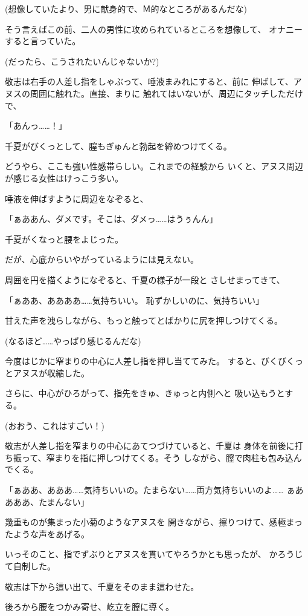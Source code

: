 ﻿\documentclass[
    book,tate,
    line_length=30zw,
    jafontsize=12pt,
    paper=b5j,
    landscape,
    ]{jlreq}
\begin{document}
(想像していたより、男に献身的で、Ｍ的なところがあるんだな)

そう言えばこの前、二人の男性に攻められているところを想像して、
オナニーすると言っていた。

(だったら、こうされたいんじゃないか?)

敬志は右手の人差し指をしゃぶって、唾液まみれにすると、前に
伸ばして、アヌスの周囲に触れた。直接、まりに
触れてはいないが、周辺にタッチしただけで、

「あんっ……！」

千夏がびくっとして、膣もぎゅんと勃起を締めつけてくる。

どうやら、ここも強い性感帯らしい。これまでの経験から
いくと、アヌス周辺が感じる女性はけっこう多い。

唾液を伸ばすように周辺をなぞると、

「ぁああん、ダメです。そこは、ダメっ……はうぅんん」

千夏がくなっと腰をよじった。

だが、心底からいやがっているようには見えない。

周囲を円を描くようになぞると、千夏の様子が一段と
さしせまってきて、

「ぁああ、ああああ……気持ちいい。 恥ずかしいのに、気持ちいい」

甘えた声を洩らしながら、もっと触ってとばかりに尻を押しつけてくる。

(なるほど……やっぱり感じるんだな)

今度はじかに窄まりの中心に人差し指を押し当ててみた。
すると、びくびくっとアヌスが収縮した。

さらに、中心がひろがって、指先をきゅ、きゅっと内側へと
吸い込もうとする。

(おおう、これはすごい！)

敬志が人差し指を窄まりの中心にあてつづけていると、千夏は
身体を前後に打ち振って、窄まりを指に押しつけてくる。そう
しながら、膣で肉柱も包み込んでくる。

「ぁああ、あああ……気持ちいいの。たまらない……両方気持ちいいのよ……
ぁああああ、たまんない」

幾重ものが集まった小菊のようなアヌスを
開きながら、擦りつけて、感極まったような声をあげる。

いっそのこと、指でずぶりとアヌスを貫いてやろうかとも思ったが、
かろうじて自制した。

敬志は下から這い出て、千夏をそのまま這わせた。

後ろから腰をつかみ寄せ、屹立を膣に導く。
\end{document}
